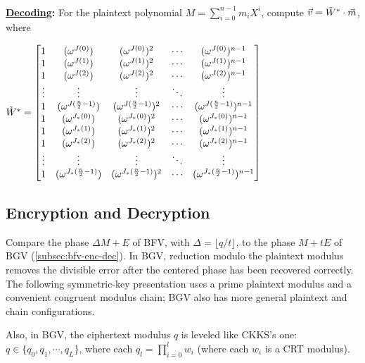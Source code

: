 \begin{tcolorbox}[title={\textbf{\tboxlabel{\ref*{subsec:bgv-encoding-decoding}} BGV's Encoding and Decoding}}]
$ $

\textbf{\underline{Decoding}:} For the plaintext polynomial $M = \sum\limits_{i=0}^{n-1} m_iX^i$,
compute $\vec{v} = \tilde W^* \cdot \vec{m}$, where

$\tilde{W}^* = \begin{bmatrix}
1 & (\omega^{J(0)}) & (\omega^{J(0)})^2 & \cdots & (\omega^{J(0)})^{n-1}\\
1 & (\omega^{J(1)}) & (\omega^{J(1)})^2 & \cdots & (\omega^{J(1)})^{n-1}\\
1 & (\omega^{J(2)}) & (\omega^{J(2)})^2 & \cdots & (\omega^{J(2)})^{n-1}\\
\vdots & \vdots & \vdots & \ddots & \vdots \\
1 & (\omega^{J(\frac{n}{2}-1)}) & (\omega^{J(\frac{n}{2}-1)})^2 & \cdots & (\omega^{J(\frac{n}{2}-1)})^{n-1}\\
1 & (\omega^{J_*(0)}) & (\omega^{J_*(0)})^2 & \cdots & (\omega^{J_*(0)})^{n-1}\\
1 & (\omega^{J_*(1)}) & (\omega^{J_*(1)})^2 & \cdots & (\omega^{J_*(1)})^{n-1}\\
1 & (\omega^{J_*(2)}) & (\omega^{J_*(2)})^2 & \cdots & (\omega^{J_*(2)})^{n-1}\\
\vdots & \vdots & \vdots & \ddots & \vdots \\
1 & (\omega^{J_*(\frac{n}{2}-1)}) & (\omega^{J_*(\frac{n}{2}-1)})^2 & \cdots & (\omega^{J_*(\frac{n}{2}-1)})^{n-1}\\
\end{bmatrix}$

\end{tcolorbox}


\subsection{Encryption and Decryption}
\label{subsec:bgv-enc-dec}

Compare the phase $\Delta M+E$ of BFV, with $\Delta=\lfloor q/t\rfloor$, to the phase $M+tE$ of BGV (\autoref{subsec:bfv-enc-dec}). In BGV, reduction modulo the plaintext modulus removes the divisible error after the centered phase has been recovered correctly. The following symmetric-key presentation uses a prime plaintext modulus and a convenient congruent modulus chain; BGV also has more general plaintext and chain configurations.

Also, in BGV, the ciphertext modulus $q$ is leveled like CKKS's one: $q \in \{q_0, q_1, \cdots, q_L\}$, where each $q_l = \prod\limits_{i=0}^l w_i$ (where each $w_i$ is a CRT modulus).

